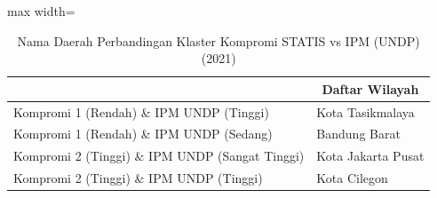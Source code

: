 \begin{table}[H]
\centering
\caption{Nama Daerah Perbandingan Klaster Kompromi STATIS vs IPM (UNDP) (2021)} \label{tab:sample2comp_ipm_name_2021}
\begin{adjustbox}{max width=\textwidth}
\begin{tabular}{|>{\centering\arraybackslash}p{4cm}|p{10cm}|}
\hline
\multicolumn{1}{|c|}{\textbf{Kategori}} & \multicolumn{1}{c|}{\textbf{Daftar Wilayah}} \\
\hline
Kompromi 1 (Rendah) \& IPM UNDP (Tinggi) & Kota Tasikmalaya \\
\hline
Kompromi 1 (Rendah) \& IPM UNDP (Sedang) & Bandung Barat \\
\hline
Kompromi 2 (Tinggi) \& IPM UNDP (Sangat Tinggi) & Kota Jakarta Pusat \\
\hline
Kompromi 2 (Tinggi) \& IPM UNDP (Tinggi) & Kota Cilegon \\
\hline
\end{tabular}
\end{adjustbox}
\end{table}